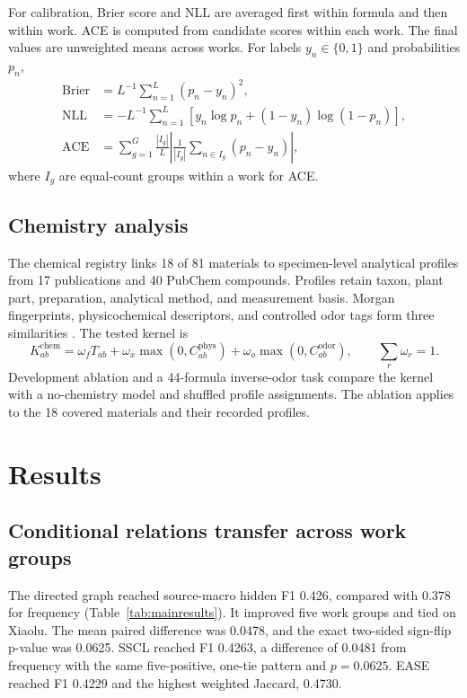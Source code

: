 \documentclass[11pt,a4paper]{article}
\newcommand{\SSCL}{\textsc{SSCL}}
\begin{document}
For calibration, Brier score and NLL are averaged first within formula and then within work. ACE is computed from candidate scores within each work. The final values are unweighted means across works. For labels $y_n\in\{0,1\}$ and probabilities $p_n$,
\begin{align}
\operatorname{Brier}&=L^{-1}\sum_{n=1}^{L}(p_n-y_n)^2,\\
\operatorname{NLL}&=-L^{-1}\sum_{n=1}^{L}\left[y_n\log p_n+(1-y_n)\log(1-p_n)\right],\\
\operatorname{ACE}&=\sum_{g=1}^{G}\frac{|I_g|}{L}
\left|\frac{1}{|I_g|}\sum_{n\in I_g}(p_n-y_n)\right|,
\label{eq:calmetrics}
\end{align}
where $I_g$ are equal-count groups within a work for ACE.

\subsection{Chemistry analysis}

The chemical registry links 18 of 81 materials to specimen-level analytical profiles from 17 publications and 40 PubChem compounds. Profiles retain taxon, plant part, preparation, analytical method, and measurement basis. Morgan fingerprints, physicochemical descriptors, and controlled odor tags form three similarities \citep{rogers2010_morgan}. The tested kernel is
\begin{equation}
K^{\mathrm{chem}}_{ab}=\omega_f T_{ab}+
\omega_x\max(0,C^{\mathrm{phys}}_{ab})+
\omega_o\max(0,C^{\mathrm{odor}}_{ab}),\qquad
\sum_r\omega_r=1.
\label{eq:chemkernel}
\end{equation}
Development ablation and a 44-formula inverse-odor task compare the kernel with a no-chemistry model and shuffled profile assignments. The ablation applies to the 18 covered materials and their recorded profiles.

\section{Results}

\subsection{Conditional relations transfer across work groups}

The directed graph reached source-macro hidden F1 0.426, compared with 0.378 for frequency (Table~\ref{tab:mainresults}). It improved five work groups and tied on Xiaolu. The mean paired difference was 0.0478, and the exact two-sided sign-flip p-value was 0.0625. \SSCL{} reached F1 0.4263, a difference of 0.0481 from frequency with the same five-positive, one-tie pattern and $p=0.0625$. EASE reached F1 0.4229 and the highest weighted Jaccard, 0.4730.
\end{document}
